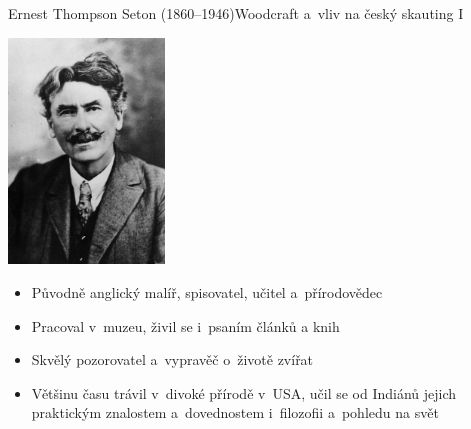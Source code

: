 \documentclass[compress, ucs, xelatex, xcolor=dvipsnames, print,
  hyperref={
    bookmarks=true,
    unicode=true,
    colorlinks=true,
    plainpages=false,
    pdfkeywords={Junak, Pedagogika, Skaut, Skauting, Vychovna metoda},
    linkcolor=Black,
    anchorcolor=Black,
    citecolor=OliveGreen,
    filecolor=OliveGreen,
    menucolor=Black,
    urlcolor=OliveGreen,
    pdftex}
  ]{beamer}
\begin{document}
\begin{frame}{Ernest Thompson Seton (1860--1946)}{Woodcraft a~vliv na český skauting I}
  \begin{multicols}{2}
    \begin{center}
      \includegraphics[height=6cm]{seton.jpg}
    \end{center}
    \columnbreak
    \begin{itemize}
      \item Původně anglický malíř, spisovatel, učitel a~přírodovědec
      \item Pracoval v~muzeu, živil se i~psaním článků a knih
      \item Skvělý pozorovatel a~vypravěč o~životě zvířat
      \item Většinu času trávil v~divoké přírodě v~USA, učil se od Indiánů jejich praktickým znalostem a~dovednostem i~filozofii a~pohledu na svět
    \end{itemize}
  \end{multicols}
\end{frame}
\end{document}
